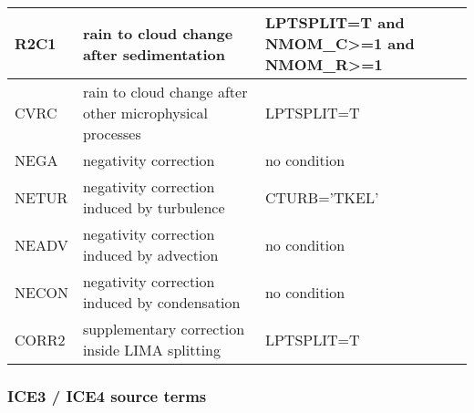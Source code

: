 \begin{longtable} {|p{}|p{}|p{}|}
R2C1   & rain to cloud change after sedimentation                 & LPTSPLIT=T and NMOM\_C>=1 and NMOM\_R>=1 \\\hline
CVRC   & rain to cloud change after other microphysical processes & LPTSPLIT=T \\\hline
NEGA   & negativity correction                                    & no condition \\\hline
NETUR  & negativity correction induced by turbulence              & CTURB='TKEL' \\\hline
NEADV  & negativity correction induced by advection               & no condition \\\hline
NECON  & negativity correction induced by condensation            & no condition \\\hline
CORR2  & supplementary correction inside LIMA splitting           & LPTSPLIT=T \\\hline
\end{longtable}

\subsubsection{ICE3 / ICE4 source terms}

